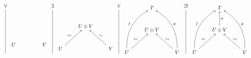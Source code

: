 \documentclass[12pt]{amsart}
\theoremstyle{definition}
\begin{document}
\begin{enumerate}
    \[
    \begin{tikzcd}[row sep=1cm, column sep=.75cm]
     \forall\arrow[ddd, dash]\\
     \\
     \\
     \;
    \end{tikzcd} 
    \begin{tikzcd}[row sep=1cm, column sep=.75cm]
      &\\
     &\\
     U & & V
    \end{tikzcd}
    \begin{tikzcd}[row sep=1cm, column sep=.75cm]
     \exists\arrow[ddd, dash]\\
     \\
     \\
     \;
    \end{tikzcd} 
    \begin{tikzcd}[row sep=1cm, column sep=.75cm]
     & \\
     & U\oplus V \\
     U\arrow[ur, "\iota_U"]& & V\arrow[ul, "\iota_v"']
    \end{tikzcd}
    \begin{tikzcd}[row sep=1cm, column sep=.75cm]
     \forall\arrow[ddd, dash,]\\
     \\
     \\
     \;
    \end{tikzcd}
    \begin{tikzcd}[row sep=1cm, column sep=.75cm]
     & T \\
     & U\oplus V \\
     U\arrow[ur, "\iota_U"]\arrow[uur, bend left, "f"]& & V\arrow[uul, bend right, "g"']\arrow[ul, "\iota_V"']
    \end{tikzcd}
    \begin{tikzcd}[row sep=1cm, column sep=.75cm]
     \exists!\arrow[ddd, dash]\\
     \\
     \\
     \;
    \end{tikzcd}
    \begin{tikzcd}[row sep=1cm, column sep=.75cm]
     & T \\
     & U\oplus V\arrow[u, "\mu"'] \\
     U\arrow[ur, "\iota_U"]\arrow[uur, bend left, "f"]& & V\arrow[uul, bend right, "g"']\arrow[ul, "\iota_V"']
    \end{tikzcd}
    \]



\end{enumerate}
\end{document}

